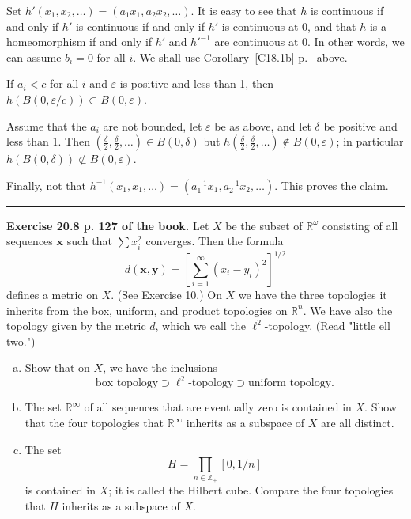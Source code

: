 \documentclass[12pt,letterpaper]{article}
\newcommand{\eps}{\varepsilon}
\newcommand{\noi}{\noindent}%
\begin{document}
Set $h'(x_1,x_2,\ldots)=(a_1x_1,a_2x_2,\ldots)$. It is easy to see that $h$ is continuous if and only if $h'$ is continuous if and only if $h'$ is continuous at 0, and that $h$ is a homeomorphism if and only if $h'$ and $h'^{-1}$ are continuous at 0. In other words, we can assume $b_i=0$ for all $i$. We shall use Corollary~\ref{C18.1b} p.~\pageref{C18.1b} above. 

If $a_i<c$ for all $i$ and $\eps$ is positive and less than 1, then $h(B(0,\eps/c))\subset B(0,\eps)$. 

Assume that the $a_i$ are not bounded, let $\eps$ be as above, and let $\delta$ be positive and less than 1. Then $(\frac\delta2,\frac\delta2,\ldots)\in B(0,\delta)$ but $h(\frac\delta2, \frac\delta2,\ldots)\notin B(0,\eps)$; in particular $h(B(0,\delta))\not\subset B(0,\eps)$. 

Finally, not that $h^{-1}(x_1,x_1,\ldots)=(a_1^{-1}x_1,a_2^{-1}x_2,\ldots)$. This proves the claim. 

\bigskip\bigskip\hrule\bigskip

\noi\textbf{Exercise 20.8 p. 127 of the book.} Let $X$ be the subset of $\mathbb{R}^{\omega}$ consisting of all sequences $\mathbf{x}$ such that $\sum x_{i}^{2}$ converges. Then the formula
    \begin{equation*}
    d(\mathbf{x}, \mathbf{y})=\left[\sum_{i=1}^{\infty}\left(x_{i}-y_{i}\right)^{2}\right]^{1 / 2}
    \end{equation*}
    defines a metric on $X$. (See Exercise 10.) On $X$ we have the three topologies it inherits from the box, uniform, and product topologies on $\mathbb{R}^{n}$. We have also the topology given by the metric $d$, which we call the $\ell^{2}$-topology. (Read "little ell two.")
    \begin{enumerate}[(a)]
        \item Show that on $X$, we have the inclusions
        \begin{equation*}
        \text{box topology} \supset \ell^{2}\text{-topology} \supset \text{uniform topology}.
        \end{equation*}
        \item The set $\mathbb{R}^{\infty}$ of all sequences that are eventually zero is contained in $X$. Show that the four topologies that $\mathbb{R}^{\infty}$ inherits as a subspace of $X$ are all distinct.
        \item The set
        \begin{equation*}
        H=\prod_{n \in \mathbb{Z}_{+}}[0,1/n]
        \end{equation*}
        is contained in $X$; it is called the Hilbert cube. Compare the four topologies that $H$ inherits as a subspace of $X$.
    \end{enumerate} 
   
\end{document}
